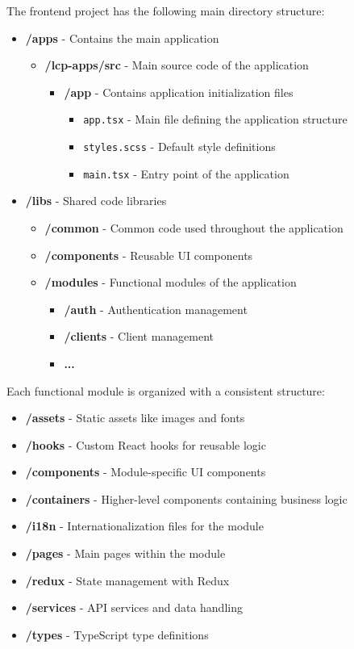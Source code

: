 The frontend project has the following main directory structure:
\begin{itemize}
    \item \textbf{/apps} - Contains the main application
    \begin{itemize}
        \item \textbf{/lcp-apps/src} - Main source code of the application
        \begin{itemize}
            \item \textbf{/app} - Contains application initialization files
            \begin{itemize}
                \item \texttt{app.tsx} - Main file defining the application structure
                \item \texttt{styles.scss} - Default style definitions
                \item \texttt{main.tsx} - Entry point of the application
            \end{itemize}
        \end{itemize}
    \end{itemize}
    
    \item \textbf{/libs} - Shared code libraries
    \begin{itemize}
        \item \textbf{/common} - Common code used throughout the application
        \item \textbf{/components} - Reusable UI components
        \item \textbf{/modules} - Functional modules of the application
        \begin{itemize}
            \item \textbf{/auth} - Authentication management
            \item \textbf{/clients} - Client management
            \item \textbf{...}
        \end{itemize}
    \end{itemize}
\end{itemize}

Each functional module is organized with a consistent structure:
\begin{itemize}
    \item \textbf{/assets} - Static assets like images and fonts
    \item \textbf{/hooks} - Custom React hooks for reusable logic
    \item \textbf{/components} - Module-specific UI components
    \item \textbf{/containers} - Higher-level components containing business logic
    \item \textbf{/i18n} - Internationalization files for the module
    \item \textbf{/pages} - Main pages within the module
    \item \textbf{/redux} - State management with Redux
    \item \textbf{/services} - API services and data handling
    \item \textbf{/types} - TypeScript type definitions
\end{itemize}

